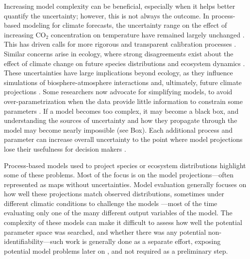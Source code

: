 \documentclass[11pt]{article}
\newcommand{\llabel}[1]{\hypertarget{lintarget:#1}{}\linelabel{lin:#1}}
\begin{document}
Increasing model complexity can be beneficial, especially when it helps better \llabel{quant2}quantify the uncertainty; however, this is not always the outcome. In process-based modeling for climate forecasts, the uncertainty range on the effect of increasing CO$_{2}$ concentration on temperature have remained largely unchanged \citep{Zelinka2020}. This has driven calls for more rigorous and transparent calibration processes \citep{balaji2022general}. Similar concerns arise in ecology, where strong disagreements exist about the effect of climate change on future species distributions \citep{Cheaib2012} and ecosystem dynamics \citep{Lovenduski2017}.
These uncertainties have large implications beyond ecology, as they influence simulations of biosphere-atmosphere interactions and, ultimately, future climate projections \citep{Bonan2018, simpson2025confronting}.
Some researchers now advocate for simplifying models, to avoid over-parametrization when the data provide little information to constrain some parameters \citep{Wang2017, Harrison2021}. 
If a model becomes too complex, it may become a black box,
and understanding the sources of uncertainty and how they propagate through the model may become nearly impossible (see Box).
Each additional process and parameter can increase overall uncertainty to the point where model projections lose their usefulness for decision makers \citep{Saltelli2020}. 

Process-based models used to project species or ecosystem distributions highlight some of these problems. Most of the focus is on the model projections---often represented as maps without uncertainties. Model evaluation generally focuses on how well these projections match observed distributions, sometimes under different climatic conditions to challenge the models \citep{VanderMeersch2025a}---most of the time evaluating only one of the many different output variables of the model.
The complexity of these models can make it difficult to assess how well the potential parameter space was searched, and whether there was any potential non-identifiability---such work is generally done as a separate effort, exposing potential model problems later on \citep{VanderMeersch2025b}, and not required as a preliminary step. 
\end{document}
